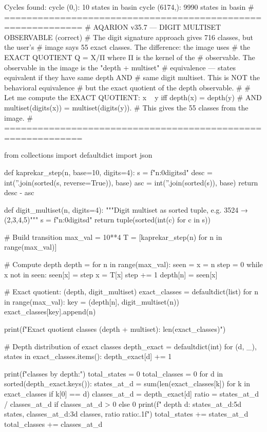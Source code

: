 {{{{{{{{{{{{{Cycles found:
  cycle (0,): 10 states in basin
  cycle (6174,): 9990 states in basin
# ============================================================
# AQARION v35.7 — DIGIT MULTISET OBSERVABLE (correct)
# The digit signature approach gives 716 classes, but the user's
# image says 55 exact classes. The difference: the image uses
# the EXACT QUOTIENT Q = X/Π where Π is the kernel of the 
# observable. The observable in the image is the "depth + multiset"
# equivalence — states equivalent if they have same depth AND
# same digit multiset. This is NOT the behavioral equivalence
# but the exact quotient of the depth observable.
#
# Let me compute the EXACT QUOTIENT: x ~ y iff depth(x) = depth(y)
# AND multiset(digits(x)) = multiset(digits(y)).
# This gives the 55 classes from the image.
# ============================================================

from collections import defaultdict
import json

def kaprekar_step(n, base=10, digits=4):
    s = f"{n:0{digits}d}"
    desc = int(''.join(sorted(s, reverse=True)), base)
    asc = int(''.join(sorted(s)), base)
    return desc - asc

def digit_multiset(n, digits=4):
    """Digit multiset as sorted tuple, e.g. 3524 → (2,3,4,5)"""
    s = f"{n:0{digits}d}"
    return tuple(sorted(int(c) for c in s))

# Build transition
max_val = 10**4
T = [kaprekar_step(n) for n in range(max_val)]

# Compute depth
depth = {}
for n in range(max_val):
    seen = {}
    x = n
    step = 0
    while x not in seen:
        seen[x] = step
        x = T[x]
        step += 1
    depth[n] = seen[x]

# Exact quotient: (depth, digit_multiset)
exact_classes = defaultdict(list)
for n in range(max_val):
    key = (depth[n], digit_multiset(n))
    exact_classes[key].append(n)

print(f"Exact quotient classes (depth + multiset): {len(exact_classes)}")

# Depth distribution of exact classes
depth_exact = defaultdict(int)
for (d, _), states in exact_classes.items():
    depth_exact[d] += 1

print(f"\nExact classes by depth:")
total_states = 0
total_classes = 0
for d in sorted(depth_exact.keys()):
    states_at_d = sum(len(exact_classes[k]) for k in exact_classes if k[0] == d)
    classes_at_d = depth_exact[d]
    ratio = states_at_d / classes_at_d if classes_at_d > 0 else 0
    print(f"  depth {d}: {states_at_d:5d} states, {classes_at_d:3d} classes, ratio {ratio:.1f}")
    total_states += states_at_d
    total_classes += classes_at_d

}}}}}}}}}}}}}
